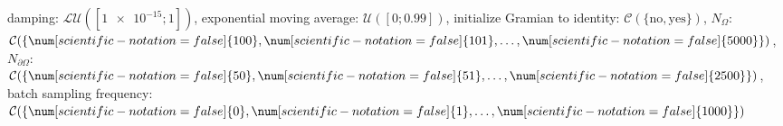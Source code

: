 damping: $\mathcal{LU}([\num[scientific-notation=true]{1e-15}; \num[scientific-notation=false]{1}])$, exponential moving average: $\mathcal{U}([\num[scientific-notation=false]{0}; \num[scientific-notation=true]{0.99}])$, initialize Gramian to identity: $\mathcal{C}(\{\text{no},\text{yes}\})$, $N_{\Omega}$: $\mathcal{C}(\{\num[scientific-notation=false]{100},\num[scientific-notation=false]{101},\text{\dots},\num[scientific-notation=false]{5000}\})$, $N_{\partial\Omega}$: $\mathcal{C}(\{\num[scientific-notation=false]{50},\num[scientific-notation=false]{51},\text{\dots},\num[scientific-notation=false]{2500}\})$, batch sampling frequency: $\mathcal{C}(\{\num[scientific-notation=false]{0},\num[scientific-notation=false]{1},\text{\dots},\num[scientific-notation=false]{1000}\})$